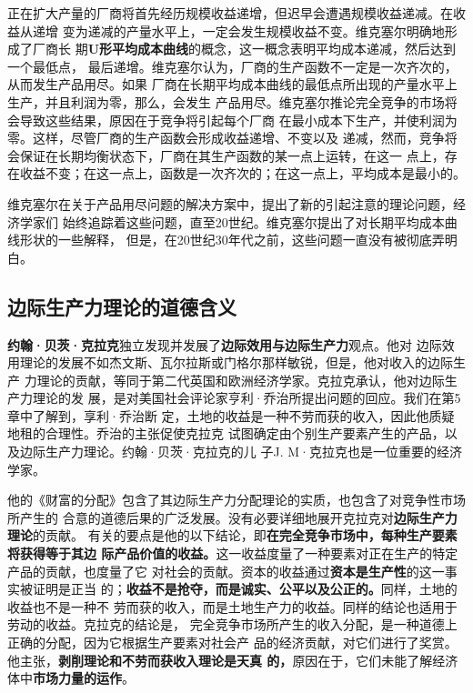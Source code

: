 正在扩大产量的厂商将首先经历规模收益递增，但迟早会遭遇规模收益递减。在收益从递增
变为递减的产量水平上，一定会发生规模收益不变。维克塞尔明确地形成了厂商长
期\textbf{U形平均成本曲线}的概念，这一概念表明平均成本递减，然后达到一个最低点，
最后递增。维克塞尔认为，厂商的生产函数不一定是一次齐次的，从而发生产品用尽。如果
厂商在长期平均成本曲线的最低点所出现的产量水平上生产，并且利润为零，那么，会发生
产品用尽。维克塞尔推论完全竞争的市场将会导致这些结果，原因在于竞争将引起每个厂商
在最小成本下生产，并使利润为零。这样，尽管厂商的生产函数会形成收益递增、不变以及
递减，然而，竞争将会保证在长期均衡状态下，厂商在其生产函数的某一点上运转，在这一
点上，存在收益不变；在这一点上，函数是一次齐次的；在这一点上，平均成本是最小的。

维克塞尔在关于产品用尽问题的解决方案中，提出了新的引起注意的理论问题，经济学家们
始终追踪着这些问题，直至20世纪。维克塞尔提出了对长期平均成本曲线形状的一些解释，
但是，在20世纪30年代之前，这些问题一直没有被彻底弄明白。

\subsection{边际生产力理论的道德含义}

\textbf{约翰·贝茨·克拉克}独立发现并发展了\textbf{边际效用与边际生产力}观点。他对
边际效用理论的发展不如杰文斯、瓦尔拉斯或门格尔那样敏锐，但是，他对收入的边际生产
力理论的贡献，等同于第二代英国和欧洲经济学家。克拉克承认，他对边际生产力理论的发
展，是对美国社会评论家亨利·乔治所提出问题的回应。我们在第5章中了解到，享利·乔治断
定，土地的收益是一种不劳而获的收入，因此他质疑地租的合理性。乔治的主张促使克拉克
试图确定由个别生产要素产生的产品，以及边际生产力理论。约翰·贝茨·克拉克的儿
子J. M·克拉克也是一位重要的经济学家。

他的《财富的分配》包含了其边际生产力分配理论的实质，也包含了对竞争性市场所产生的
合意的道德后果的广泛发展。没有必要详细地展开克拉克对\textbf{边际生产力理论}的贡献。
有关的要点是他的以下结论，即\textbf{在完全竞争市场中，每种生产要素将获得等于其边
  际产品价值的收益。}这一收益度量了一种要素对正在生产的特定产品的贡献，也度量了它
对社会的贡献。资本的收益通过\textbf{资本是生产性}的这一事实被证明是正当
的；\textbf{收益不是抢夺，而是诚实、公平以及公正的。}同样，土地的收益也不是一种不
劳而获的收入，而是土地生产力的收益。同样的结论也适用于劳动的收益。克拉克的结论是，
完全竞争市场所产生的收入分配，是一种道德上正确的分配，因为它根据生产要素对社会产
品的经济贡献，对它们进行了奖赏。他主张，\textbf{剥削理论和不劳而获收入理论是天真
  的，}原因在于，它们未能了解经济体中\textbf{市场力量的运作}。


